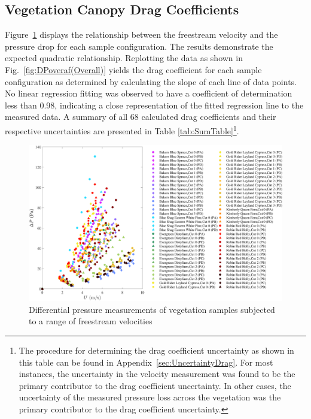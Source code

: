 \documentclass[12pt]{article}
\begin{document}
\pagebreak


\subsection{Vegetation Canopy Drag Coefficients}
\label{ssec:headingscap}

Figure~\ref{fig:DPvU(Overall)} displays the relationship between the freestream velocity and the pressure drop for each sample configuration. The results demonstrate the expected quadratic relationship. Replotting the data as shown in Fig.~\ref{fig:DPoveraf(Overall)} yields the drag coefficient for each sample configuration as determined by calculating the slope of each line of data points. No linear regression fitting was observed to have a coefficient of determination less than 0.98, indicating a close representation of the fitted regression line to the measured data. A summary of all 68 calculated drag coefficients and their respective uncertainties are presented in Table \ref{tab:SumTable}\footnote{The procedure for determining the drag coefficient uncertainty as shown in this table can be found in Appendix~\ref{sec:UncertaintyDrag}. For most instances, the uncertainty in the velocity measurement was found to be the primary contributor to the drag coefficient uncertainty. In other cases, the uncertainty of the measured pressure loss across the vegetation was the primary contributor to the drag coefficient uncertainty.}.

\begin{figure} [!]
	\centering
	\includegraphics[width=\textwidth,keepaspectratio]{Picture8.pdf}
	\caption[Differential pressure measurements of vegetation samples]{Differential pressure measurements of vegetation samples subjected to a range of freestream velocities}
	\label{fig:DPvU(Overall)}
\end{figure}
\end{document}
